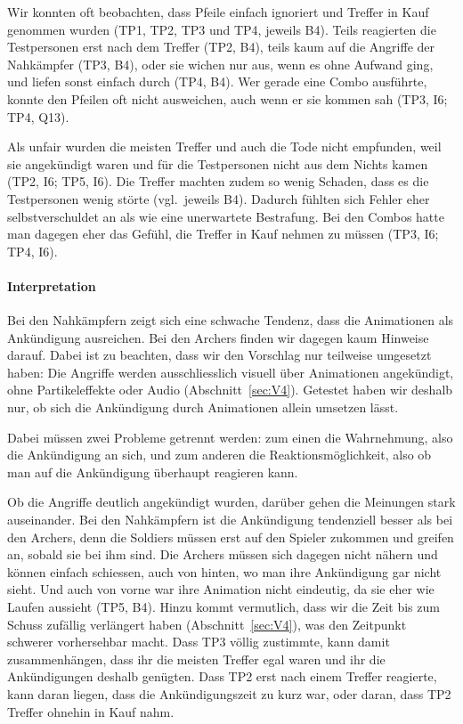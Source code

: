\documentclass[../Main.tex]{subfiles}
\begin{document}
Wir konnten oft beobachten, dass Pfeile einfach ignoriert und Treffer in Kauf genommen wurden (TP1, TP2, TP3 und TP4, jeweils B4). Teils reagierten die Testpersonen erst nach dem Treffer (TP2, B4), teils kaum auf die Angriffe der Nahkämpfer (TP3, B4), oder sie wichen nur aus, wenn es ohne Aufwand ging, und liefen sonst einfach durch (TP4, B4). Wer gerade eine Combo ausführte, konnte den Pfeilen oft nicht ausweichen, auch wenn er sie kommen sah (TP3, I6; TP4, Q13).

Als unfair wurden die meisten Treffer und auch die Tode nicht empfunden, weil sie angekündigt waren und für die Testpersonen nicht aus dem Nichts kamen (TP2, I6; TP5, I6). Die Treffer machten zudem so wenig Schaden, dass es die Testpersonen wenig störte (vgl.\ jeweils B4). Dadurch fühlten sich Fehler eher selbstverschuldet an als wie eine unerwartete Bestrafung. Bei den Combos hatte man dagegen eher das Gefühl, die Treffer in Kauf nehmen zu müssen (TP3, I6; TP4, I6).

\paragraph{Interpretation}
Bei den Nahkämpfern zeigt sich eine schwache Tendenz, dass die Animationen als Ankündigung ausreichen. Bei den Archers finden wir dagegen kaum Hinweise darauf. Dabei ist zu beachten, dass wir den Vorschlag nur teilweise umgesetzt haben: Die Angriffe werden ausschliesslich visuell über Animationen angekündigt, ohne Partikeleffekte oder Audio (Abschnitt~\ref{sec:V4}). Getestet haben wir deshalb nur, ob sich die Ankündigung durch Animationen allein umsetzen lässt.

Dabei müssen zwei Probleme getrennt werden: zum einen die Wahrnehmung, also die Ankündigung an sich, und zum anderen die Reaktionsmöglichkeit, also ob man auf die Ankündigung überhaupt reagieren kann.

Ob die Angriffe deutlich angekündigt wurden, darüber gehen die Meinungen stark auseinander. Bei den Nahkämpfern ist die Ankündigung tendenziell besser als bei den Archers, denn die Soldiers müssen erst auf den Spieler zukommen und greifen an, sobald sie bei ihm sind. Die Archers müssen sich dagegen nicht nähern und können einfach schiessen, auch von hinten, wo man ihre Ankündigung gar nicht sieht. Und auch von vorne war ihre Animation nicht eindeutig, da sie eher wie Laufen aussieht (TP5, B4). Hinzu kommt vermutlich, dass wir die Zeit bis zum Schuss zufällig verlängert haben (Abschnitt~\ref{sec:V4}), was den Zeitpunkt schwerer vorhersehbar macht. Dass TP3 völlig zustimmte, kann damit zusammenhängen, dass ihr die meisten Treffer egal waren und ihr die Ankündigungen deshalb genügten. Dass TP2 erst nach einem Treffer reagierte, kann daran liegen, dass die Ankündigungszeit zu kurz war, oder daran, dass TP2 Treffer ohnehin in Kauf nahm.
\end{document}
